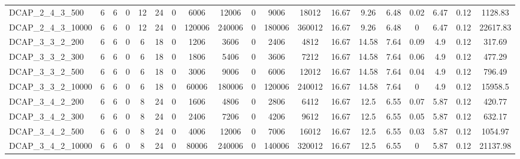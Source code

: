 \begin{table}[H]
{{\begin{tabular}{|l|ccc|ccc|ccccc|cccc|ccc|}
				DCAP\_2\_4\_3\_500             & 6         & 6        & 0       & 12            & 24           & 0            & 6006   & 12006  & 0   & 9006   & 18012  & 16.67   & 9.26    & 6.48    & 0.02  & 6.47      & 0.12     & 1128.83      \\
				DCAP\_2\_4\_3\_10000           & 6         & 6        & 0       & 12            & 24           & 0            & 120006 & 240006 & 0   & 180006 & 360012 & 16.67   & 9.26    & 6.48    & 0     & 6.47      & 0.12     & 22617.83     \\
				DCAP\_3\_3\_2\_200             & 6         & 6        & 0       & 6             & 18           & 0            & 1206   & 3606   & 0   & 2406   & 4812   & 16.67   & 14.58   & 7.64    & 0.09  & 4.9       & 0.12     & 317.69       \\
				DCAP\_3\_3\_2\_300             & 6         & 6        & 0       & 6             & 18           & 0            & 1806   & 5406   & 0   & 3606   & 7212   & 16.67   & 14.58   & 7.64    & 0.06  & 4.9       & 0.12     & 477.29       \\
				DCAP\_3\_3\_2\_500             & 6         & 6        & 0       & 6             & 18           & 0            & 3006   & 9006   & 0   & 6006   & 12012  & 16.67   & 14.58   & 7.64    & 0.04  & 4.9       & 0.12     & 796.49       \\
				DCAP\_3\_3\_2\_10000           & 6         & 6        & 0       & 6             & 18           & 0            & 60006  & 180006 & 0   & 120006 & 240012 & 16.67   & 14.58   & 7.64    & 0     & 4.9       & 0.12     & 15958.5      \\
				DCAP\_3\_4\_2\_200             & 6         & 6        & 0       & 8             & 24           & 0            & 1606   & 4806   & 0   & 2806   & 6412   & 16.67   & 12.5    & 6.55    & 0.07  & 5.87      & 0.12     & 420.77       \\
				DCAP\_3\_4\_2\_300             & 6         & 6        & 0       & 8             & 24           & 0            & 2406   & 7206   & 0   & 4206   & 9612   & 16.67   & 12.5    & 6.55    & 0.05  & 5.87      & 0.12     & 632.17       \\
				DCAP\_3\_4\_2\_500             & 6         & 6        & 0       & 8             & 24           & 0            & 4006   & 12006  & 0   & 7006   & 16012  & 16.67   & 12.5    & 6.55    & 0.03  & 5.87      & 0.12     & 1054.97      \\
				DCAP\_3\_4\_2\_10000           & 6         & 6        & 0       & 8             & 24           & 0            & 80006  & 240006 & 0   & 140006 & 320012 & 16.67   & 12.5    & 6.55    & 0     & 5.87      & 0.12     & 21137.98     \\ \hline
			\end{tabular}
		}
	}
\end{table}

